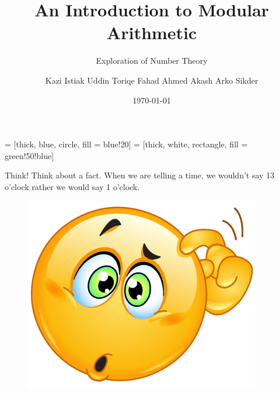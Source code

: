 \documentclass{beamer}
\title{An Introduction to Modular Arithmetic}
\subtitle{Exploration of Number Theory}
\author{Kazi Istiak Uddin Toriqe \newline Fahad Ahmed Akash \newline Arko Sikder}
\institute[BUET]
{
    Department of CSE, BUET
}
\date{\today}
\begin{document}
\frame{\titlepage}

 = [thick, blue, circle, fill = blue!20]
 = [thick, white, rectangle, fill = green!50!blue]

\begin{frame}{}
\centering
\end{frame}

\begin{frame}{Think!}
    Think about a fact. When we are telling a time, we wouldn't say 13 o'clock rather we would say 1 o'clock.
    \newline
    \newline
    \begin{center}
        \begin{figure}
            \centering
            \includegraphics[scale = 0.3]{think.png}
        \end{figure}
    \end{center}
\end{frame}
\end{document}
